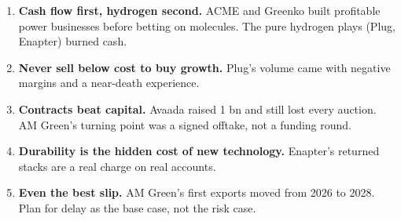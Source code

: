 \begin{finding}
\begin{enumerate}[leftmargin=1.4em,label={\color{audit}\arabic*}]
\item \textbf{Cash flow first, hydrogen second.} ACME and Greenko built profitable power businesses before betting on molecules. The pure hydrogen plays (Plug, Enapter) burned cash.
\item \textbf{Never sell below cost to buy growth.} Plug's volume came with negative margins and a near-death experience.
\item \textbf{Contracts beat capital.} Avaada raised \usd{}1 bn and still lost every auction. AM Green's turning point was a signed offtake, not a funding round.
\item \textbf{Durability is the hidden cost of new technology.} Enapter's returned stacks are a real charge on real accounts.
\item \textbf{Even the best slip.} AM Green's first exports moved from 2026 to 2028. Plan for delay as the base case, not the risk case.
\end{enumerate}
\confM
\end{finding}
